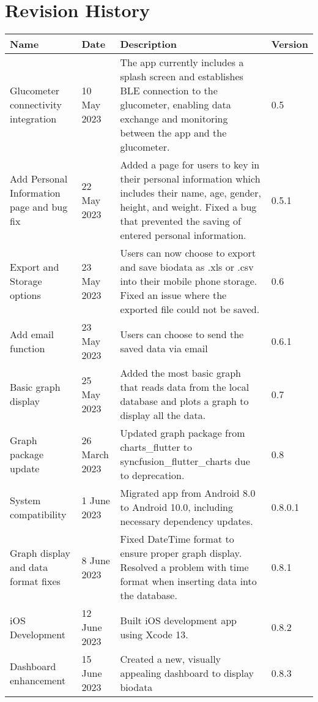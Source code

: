 \documentclass[a4paper]{scrreprt}
\begin{document}
\section*{Revision History}
\begin{center}
\begin{longtable}{|p{2.8cm}|l|p{7.5cm}|l|}
    \hline
    \textbf{Name} & \textbf{Date} & \textbf{Description} & \textbf{Version} \\
    \hline
    Glucometer connectivity integration & 10 May 2023 & The app currently includes a splash screen and establishes BLE connection to the glucometer, enabling data exchange and monitoring between the app and the glucometer. & 0.5 \\
    \hline
    Add Personal Information page and bug fix & 22 May 2023 & Added a page for users to key in their personal information which includes their name, age, gender, height, and weight. Fixed a bug that prevented the saving of entered personal information. & 0.5.1\\
    \hline
    Export and Storage options & 23 May 2023 & Users can now choose to export and save biodata as .xls or .csv into their mobile phone storage. Fixed an issue where the exported file could not be saved. & 0.6 \\
    \hline
    Add email function & 23 May 2023 & Users can choose to send the saved data via email  & 0.6.1\\
    \hline
    Basic graph display & 25 May 2023 & Added the most basic graph that reads data from the local database and plots a graph to display all the data. & 0.7\\
    \hline
    Graph package update & 26 March 2023 & Updated graph package from charts_flutter to syncfusion_flutter_charts due to deprecation. & 0.8\\
    \hline
    System compatibility & 1 June 2023 & Migrated app from Android 8.0 to Android 10.0, including necessary dependency updates. & 0.8.0.1\\
    \hline
    Graph display and data format fixes & 8 June 2023 & Fixed DateTime format to ensure proper graph display. Resolved a problem with time format when inserting data into the database. & 0.8.1\\
    \hline
    iOS Development & 12 June 2023 & Built iOS development app using Xcode 13. & 0.8.2\\
    \hline
    Dashboard enhancement & 15 June 2023 & Created a new, visually appealing dashboard to display biodata & 0.8.3\\

\end{longtable}
\end{center}
\end{document}

